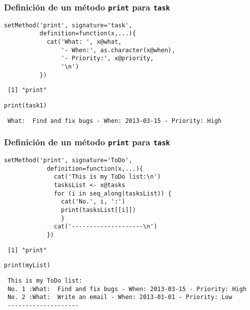 \documentclass[xcolor={usenames,svgnames,dvipsnames}]{beamer}
\begin{document}
\begin{frame}[fragile]
\frametitle{Definición de un método \texttt{print} para \texttt{task}}
\label{sec-3-2-3}


\lstset{language=R}
\begin{lstlisting}
setMethod('print', signature='task',
          definition=function(x,...){
            cat('What: ', x@what,
                '- When:', as.character(x@when),
                '- Priority:', x@priority,
                '\n')
          })
\end{lstlisting}

\begin{verbatim}
 [1] "print"
\end{verbatim}



\lstset{language=R}
\begin{lstlisting}
print(task1)
\end{lstlisting}

\begin{verbatim}
 What:  Find and fix bugs - When: 2013-03-15 - Priority: High
\end{verbatim}
\end{frame}
\begin{frame}[fragile]
\frametitle{Definición de un método \texttt{print} para \texttt{task}}
\label{sec-3-2-4}


\lstset{language=R}
\begin{lstlisting}
setMethod('print', signature='ToDo',
            definition=function(x,...){
              cat('This is my ToDo list:\n')
              tasksList <- x@tasks
              for (i in seq_along(tasksList)) {
                cat('No.', i, ':')
                print(tasksList[[i]])
                }
              cat('--------------------\n')
            })
\end{lstlisting}

\begin{verbatim}
 [1] "print"
\end{verbatim}


\lstset{language=R}
\begin{lstlisting}
print(myList)
\end{lstlisting}

\begin{verbatim}
 This is my ToDo list:
 No. 1 :What:  Find and fix bugs - When: 2013-03-15 - Priority: High 
 No. 2 :What:  Write an email - When: 2013-01-01 - Priority: Low 
 --------------------
\end{verbatim}
\end{frame}
\end{document}
